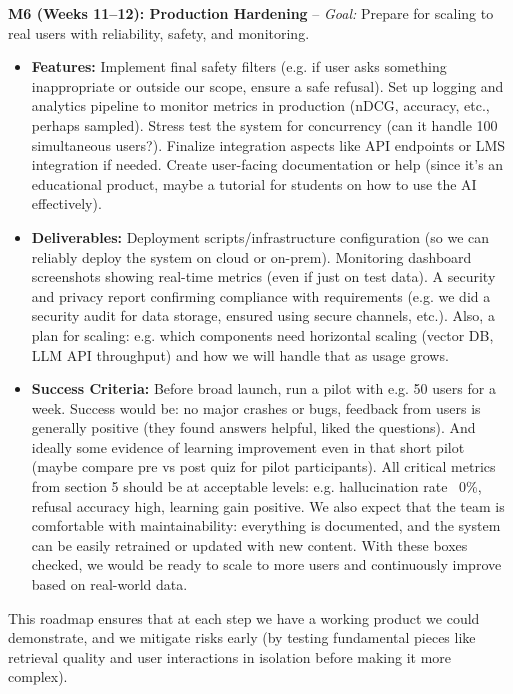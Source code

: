 \documentclass[11pt]{article}
\begin{document}
\textbf{M6 (Weeks 11–12): Production Hardening} – \textit{Goal:} Prepare for scaling to real users with reliability, safety, and monitoring.
  \begin{itemize}
    \item \textbf{Features:} Implement final safety filters (e.g. if user asks something inappropriate or outside our scope, ensure a safe refusal). Set up logging and analytics pipeline to monitor metrics in production (nDCG, accuracy, etc., perhaps sampled). Stress test the system for concurrency (can it handle 100 simultaneous users?). Finalize integration aspects like API endpoints or LMS integration if needed. Create user-facing documentation or help (since it’s an educational product, maybe a tutorial for students on how to use the AI effectively).
    \item \textbf{Deliverables:} Deployment scripts/infrastructure configuration (so we can reliably deploy the system on cloud or on-prem). Monitoring dashboard screenshots showing real-time metrics (even if just on test data). A security and privacy report confirming compliance with requirements (e.g. we did a security audit for data storage, ensured using secure channels, etc.). Also, a plan for scaling: e.g. which components need horizontal scaling (vector DB, LLM API throughput) and how we will handle that as usage grows.
    \item \textbf{Success Criteria:} Before broad launch, run a pilot with e.g. 50 users for a week. Success would be: no major crashes or bugs, feedback from users is generally positive (they found answers helpful, liked the questions). And ideally some evidence of learning improvement even in that short pilot (maybe compare pre vs post quiz for pilot participants). All critical metrics from section 5 should be at acceptable levels: e.g. hallucination rate ~0\%, refusal accuracy high, learning gain positive. We also expect that the team is comfortable with maintainability: everything is documented, and the system can be easily retrained or updated with new content. With these boxes checked, we would be ready to scale to more users and continuously improve based on real-world data.
  \end{itemize}

This roadmap ensures that at each step we have a working product we could demonstrate, and we mitigate risks early (by testing fundamental pieces like retrieval quality and user interactions in isolation before making it more complex).
\end{document}
